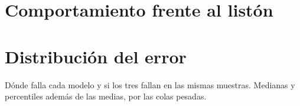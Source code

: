\section{Comportamiento frente al listón}
\label{sec:vs_baseline}

\section{Distribución del error}
\label{sec:errores}
Dónde falla cada modelo y si los tres fallan en las mismas muestras. Medianas y
percentiles además de las medias, por las colas pesadas.
